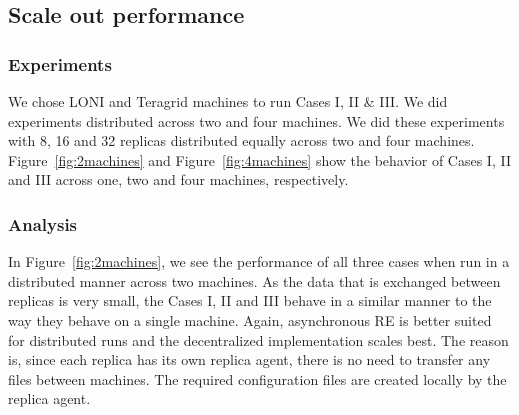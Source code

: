 \documentclass[a4paper,10pt]{article}
\begin{document}
\subsection{Scale out performance}
\subsubsection{Experiments}
We chose LONI and Teragrid machines to run Cases I, II \& III. We did experiments distributed across two and four machines. We did these experiments with 8, 16 and 32 replicas distributed equally across two and four machines. 
Figure~\ref{fig:2machines} and Figure~\ref{fig:4machines} show the behavior of Cases I, II and III across one, two and four machines, respectively.

\subsubsection{Analysis}
In Figure~\ref{fig:2machines}, we see the performance of all three cases when run in a distributed manner across two machines. As the data that is exchanged between replicas is very small, the Cases I, II and III behave in a similar manner to the way they behave on a single machine. Again, asynchronous RE is better suited for distributed runs and the decentralized implementation scales best. The reason is, since each replica has its own replica agent, there is no need to transfer any files between machines. The required configuration files are created locally by the replica agent.
\end{document}
